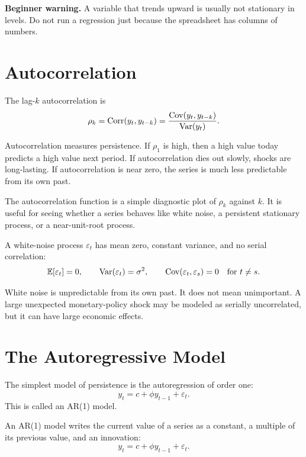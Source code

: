 \begin{boxF}
\textbf{Beginner warning.} A variable that trends upward is usually not stationary in levels. Do not run a regression just because the spreadsheet has columns of numbers.
\end{boxF}

\section{Autocorrelation}

\begin{defN}[Autocorrelation]
The lag-\(k\) autocorrelation is
\[
    \rho_k
    =
    \mathrm{Corr}(y_t,y_{t-k})
    =
    \frac{\mathrm{Cov}(y_t,y_{t-k})}{\mathrm{Var}(y_t)}.
\]
\end{defN}

Autocorrelation measures persistence. If \(\rho_1\) is high, then a high value today predicts a high value next period. If autocorrelation dies out slowly, shocks are long-lasting. If autocorrelation is near zero, the series is much less predictable from its own past.

The autocorrelation function is a simple diagnostic plot of \(\rho_k\) against \(k\). It is useful for seeing whether a series behaves like white noise, a persistent stationary process, or a near-unit-root process.

\begin{defN}
A white-noise process \(\varepsilon_t\) has mean zero, constant variance, and no serial correlation:
\[
    \mathbb{E}[\varepsilon_t]=0,\qquad
    \mathrm{Var}(\varepsilon_t)=\sigma^2,\qquad
    \mathrm{Cov}(\varepsilon_t,\varepsilon_s)=0\quad\text{for }t\neq s.
\]
\end{defN}

White noise is unpredictable from its own past. It does not mean unimportant. A large unexpected monetary-policy shock may be modeled as serially uncorrelated, but it can have large economic effects.

\section{The Autoregressive Model}

The simplest model of persistence is the autoregression of order one:
\[
    y_t=c+\phi y_{t-1}+\varepsilon_t.
\]
This is called an AR(1) model.

\begin{defN}[AR(1)]
An AR(1) model writes the current value of a series as a constant, a multiple of its previous value, and an innovation:
\[
    y_t=c+\phi y_{t-1}+\varepsilon_t.
\]
\end{defN}

